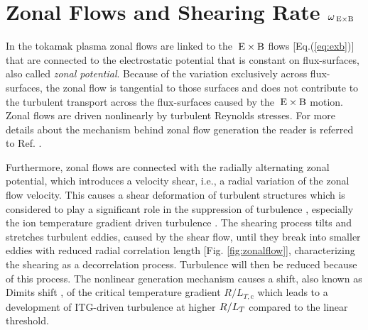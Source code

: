 \newpage
\section{Zonal Flows and Shearing Rate $\omega_{\mathrm{\:E \times B}}$}
\label{sec:zonalflow}

In the tokamak plasma zonal flows are linked to the $\mathrm{\:E}\times\mathrm{B}$ flows [Eq.(\ref{eq:exb})] that are connected to the electrostatic potential that is constant on flux-surfaces, also called \textit{zonal potential}. \cite{Diamond2005} Because of the variation exclusively across flux-surfaces, the zonal flow is tangential to those surfaces and does not contribute to the turbulent transport across the flux-surfaces caused by the $\mathrm{\:E}\times\mathrm{B}$ motion. 
Zonal flows are driven nonlinearly by turbulent Reynolds stresses. \cite{Diamond1991} For more details about the mechanism behind zonal flow generation the reader is referred to Ref. . \bigskip


Furthermore, zonal flows are connected with the radially alternating zonal potential, which introduces a velocity shear, i.e., a radial variation of the zonal flow velocity. This causes a shear deformation of turbulent structures which is considered to play a significant role in the suppression of turbulence \cite{Biglari1990, Dimits2000}, especially the ion temperature gradient driven turbulence \cite{Nakata2012, Makwana2014, Maeyama2014, Whelan2018, Whelan2019}. The shearing process tilts and stretches turbulent eddies, caused by the shear flow, until they break into smaller eddies with reduced radial correlation length [Fig. \ref{fig:zonalflow}],  characterizing the shearing as a decorrelation process. Turbulence will then be reduced because of this process. \cite{Biglari1990,Diamond2005,Burnell1997} The nonlinear generation mechanism causes a shift, also known as Dimits shift \cite{Dimits2000}, of the critical temperature gradient $R/L_{T,\mathrm{c}}$ which leads to a development of ITG-driven turbulence at higher $R/L_T$ compared to the linear threshold. \bigskip

\newpage

